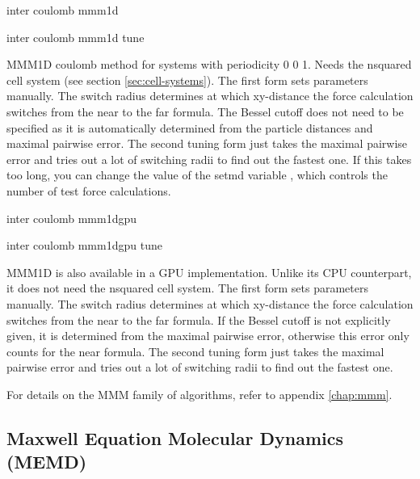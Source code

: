 \begin{essyntax}
  inter coulomb  mmm1d 

  inter coulomb  mmm1d tune 
  \begin{features}
  \end{features}
\end{essyntax}
MMM1D coulomb method for systems with periodicity 0 0 1. Needs the
nsquared cell system (see section \vref{sec:cell-systems}). The first
form sets parameters manually. The switch radius determines at which
xy-distance the force calculation switches from the near to the far
formula. The Bessel cutoff does not need to be specified as it is
automatically determined from the particle distances and maximal
pairwise error. The second tuning form just takes the
maximal pairwise error and tries out a lot of switching radii to find
out the fastest one. If this takes too long, you can change the value
of the setmd variable , which controls the number of
test force calculations.

\begin{essyntax}
  inter coulomb  mmm1dgpu 
   

  inter coulomb  mmm1dgpu tune 
  \begin{features}
  \end{features}
\end{essyntax}
MMM1D is also available in a GPU implementation. Unlike its CPU
counterpart, it  does not need the nsquared cell system. The first
form sets parameters manually. The switch radius determines at which
xy-distance the force calculation switches from the near to the far
formula. If the Bessel cutoff is not explicitly given, it is
determined from the maximal pairwise error, otherwise this error only
counts for the near formula. The second tuning form just takes the
maximal pairwise error and tries out a lot of switching radii to find
out the fastest one.

For details on the MMM family of algorithms, refer to appendix
\vref{chap:mmm}.

\subsection{Maxwell Equation Molecular Dynamics (MEMD)}

